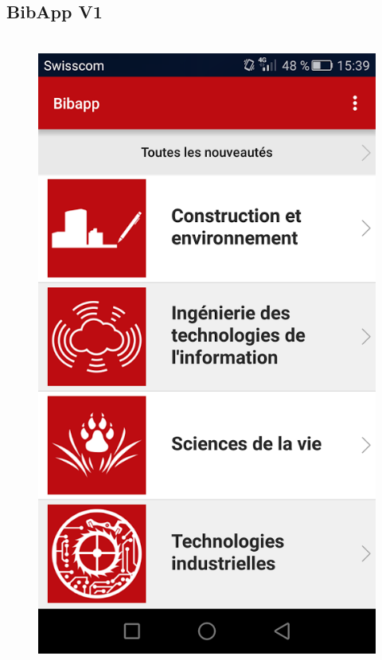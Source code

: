 \documentclass[10pt]{beamer}
\begin{document}
\subsection{BibApp V1}
\begin{frame}
	\frametitle{\secname}
	\framesubtitle{\subsecname}
	\begin{columns}[T]
		\begin{column}{.65\textwidth}
            \begin{columns}[T]
                \begin{column}{.3\textwidth}
                    \begin{figure}
                        \includegraphics[width=1\textwidth]{images/unnamed.png}

\end{figure}
\end{column}
\end{columns}
\end{column}
\end{columns}
\end{frame}
\end{document}
